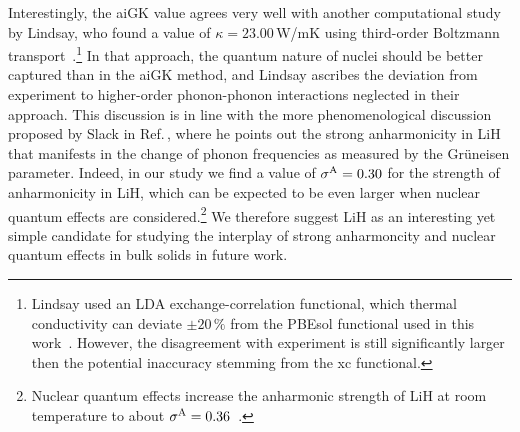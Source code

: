 Interestingly, the aiGK value agrees very well with another computational study by Lindsay, who found a value of $\kappa = 23.00$\,W/mK using third-order Boltzmann transport~\cite{Lindsay.2016}.\footnote{Lindsay used an LDA exchange-correlation functional, which thermal conductivity can deviate $\pm 20\,\%$ from the PBEsol functional used in this work~\cite{Carbogno.2016}. However, the disagreement with experiment is still significantly larger then the potential inaccuracy stemming from the xc functional.} In that approach, the quantum nature of nuclei should be better captured than in the aiGK method, and Lindsay ascribes the deviation from experiment to higher-order phonon-phonon interactions neglected in their approach. This discussion is in line with the more phenomenological discussion proposed by Slack in Ref.\,\cite{Slack.1973}, where he points out the strong anharmonicity in LiH that manifests in the change of phonon frequencies as measured by the Gr\"uneisen parameter. Indeed, in our study we find a value of $\sigma^\mathrm{A} = 0.30$ for the strength of anharmonicity in LiH, which can be expected to be even larger when nuclear quantum effects are considered.\footnote{Nuclear quantum effects increase the anharmonic strength of LiH at room temperature to about $\sigma^\mathrm{A} = 0.36$~\cite{hengst1}.} We therefore suggest LiH as an interesting yet simple candidate for studying the interplay of strong anharmoncity and nuclear quantum effects in bulk solids in future work.

